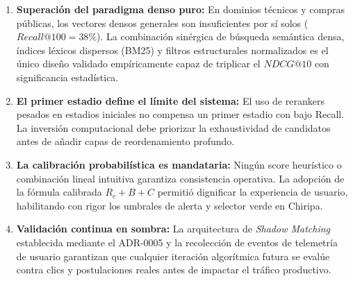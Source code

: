 \documentclass[11pt,a4paper]{article}
\begin{document}
\begin{enumerate}[leftmargin=*]
    \item \textbf{Superación del paradigma denso puro:} En dominios técnicos y compras públicas, los vectores densos generales son insuficientes por sí solos ($Recall@100 = 38\%$). La combinación sinérgica de búsqueda semántica densa, índices léxicos dispersos (BM25) y filtros estructurales normalizados es el único diseño validado empíricamente capaz de triplicar el $NDCG@10$ con significancia estadística.
    \item \textbf{El primer estadio define el límite del sistema:} El uso de rerankers pesados en estadios iniciales no compensa un primer estadio con bajo Recall. La inversión computacional debe priorizar la exhaustividad de candidatos antes de añadir capas de reordenamiento profundo.
    \item \textbf{La calibración probabilística es mandataria:} Ningún score heurístico o combinación lineal intuitiva garantiza consistencia operativa. La adopción de la fórmula calibrada $R_c + B + C$ permitió dignificar la experiencia de usuario, habilitando con rigor los umbrales de alerta y selector verde en Chiripa.
    \item \textbf{Validación continua en sombra:} La arquitectura de \textit{Shadow Matching} establecida mediante el ADR-0005 y la recolección de eventos de telemetría de usuario garantizan que cualquier iteración algorítmica futura se evalúe contra clics y postulaciones reales antes de impactar el tráfico productivo.
\end{enumerate}
\end{document}
